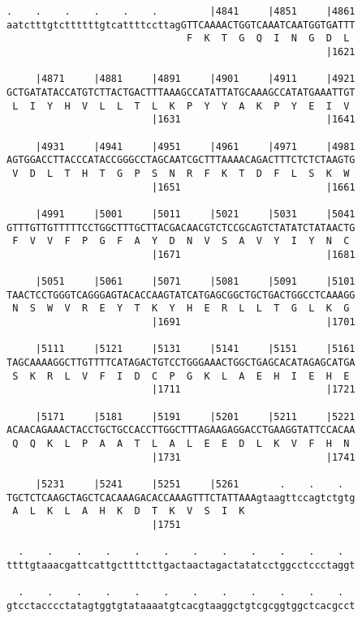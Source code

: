 \documentclass{article}
\begin{document}
\begin{Verbatim}
.    .    .    .    .    .         |4841     |4851     |4861
aatctttgtcttttttgtcattttccttagGTTCAAAACTGGTCAAATCAATGGTGATTT
                               F  K  T  G  Q  I  N  G  D  L 
                                                       |1621
  
     |4871     |4881     |4891     |4901     |4911     |4921
GCTGATATACCATGTCTTACTGACTTTAAAGCCATATTATGCAAAGCCATATGAAATTGT
 L  I  Y  H  V  L  L  T  L  K  P  Y  Y  A  K  P  Y  E  I  V 
                         |1631                         |1641
  
     |4931     |4941     |4951     |4961     |4971     |4981
AGTGGACCTTACCCATACCGGGCCTAGCAATCGCTTTAAAACAGACTTTCTCTCTAAGTG
 V  D  L  T  H  T  G  P  S  N  R  F  K  T  D  F  L  S  K  W 
                         |1651                         |1661
  
     |4991     |5001     |5011     |5021     |5031     |5041
GTTTGTTGTTTTTCCTGGCTTTGCTTACGACAACGTCTCCGCAGTCTATATCTATAACTG
 F  V  V  F  P  G  F  A  Y  D  N  V  S  A  V  Y  I  Y  N  C 
                         |1671                         |1681
  
     |5051     |5061     |5071     |5081     |5091     |5101
TAACTCCTGGGTCAGGGAGTACACCAAGTATCATGAGCGGCTGCTGACTGGCCTCAAAGG
 N  S  W  V  R  E  Y  T  K  Y  H  E  R  L  L  T  G  L  K  G 
                         |1691                         |1701
  
     |5111     |5121     |5131     |5141     |5151     |5161
TAGCAAAAGGCTTGTTTTCATAGACTGTCCTGGGAAACTGGCTGAGCACATAGAGCATGA
 S  K  R  L  V  F  I  D  C  P  G  K  L  A  E  H  I  E  H  E 
                         |1711                         |1721
  
     |5171     |5181     |5191     |5201     |5211     |5221
ACAACAGAAACTACCTGCTGCCACCTTGGCTTTAGAAGAGGACCTGAAGGTATTCCACAA
 Q  Q  K  L  P  A  A  T  L  A  L  E  E  D  L  K  V  F  H  N 
                         |1731                         |1741
  
     |5231     |5241     |5251     |5261       .    .    .  
TGCTCTCAAGCTAGCTCACAAAGACACCAAAGTTTCTATTAAAgtaagttccagtctgtg
 A  L  K  L  A  H  K  D  T  K  V  S  I  K                   
                         |1751                              
  
  .    .    .    .    .    .    .    .    .    .    .    .  
ttttgtaaacgattcattgcttttcttgactaactagactatatcctggcctccctaggt
                                                            
  .    .    .    .    .    .    .    .    .    .    .    .  
gtcctacccctatagtggtgtataaaatgtcacgtaaggctgtcgcggtggctcacgcct
                                                            

\end{Verbatim}
\end{document}
